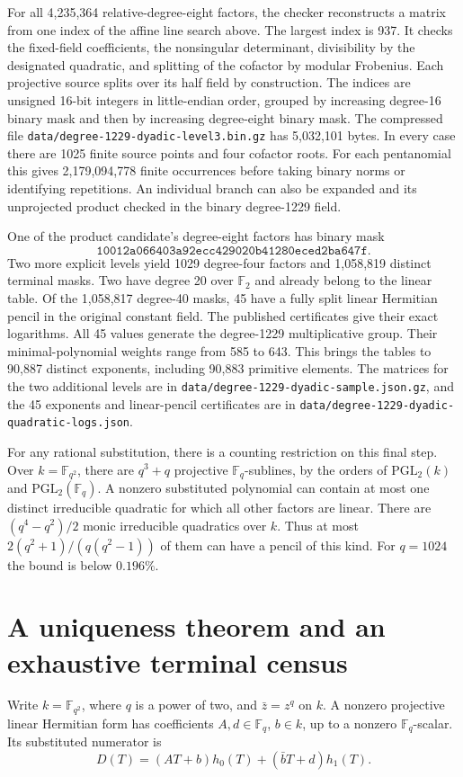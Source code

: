 \documentclass[11pt]{article}
\newcommand{\F}{\mathbb F_2}
\begin{document}
For all 4,235,364 relative-degree-eight factors, the checker
reconstructs a matrix from one index of the affine line search
above. The largest index is 937. It checks the fixed-field
coefficients, the nonsingular determinant, divisibility by the
designated quadratic, and splitting of the cofactor by modular
Frobenius. Each projective source splits over its half field by
construction. The indices are unsigned 16-bit integers in
little-endian order, grouped by increasing degree-16 binary mask and
then by increasing degree-eight binary mask. The compressed file
\nolinkurl{data/degree-1229-dyadic-level3.bin.gz} has 5,032,101 bytes.
In every case there are 1025 finite source points and four cofactor
roots. For each pentanomial this gives 2,179,094,778 finite
occurrences before taking binary norms or identifying repetitions.
An individual branch can also be expanded and its unprojected
product checked in the binary degree-1229 field.

One of the product candidate's degree-eight factors has binary mask
\[
   \mathtt{10012a066403a92ecc429020b41280eced2ba647f}.
\]
Two more explicit levels yield 1029 degree-four factors and 1,058,819
distinct terminal masks. Two have degree 20 over \(\F\) and already
belong to the linear table. Of the 1,058,817 degree-40 masks, 45
have a fully split linear Hermitian pencil in the original constant
field. The published certificates give their exact logarithms.
All 45 values generate the degree-1229 multiplicative group.
Their minimal-polynomial weights range from 585 to 643.
This brings the tables to 90,887 distinct exponents, including
90,883 primitive elements. The matrices for the two additional levels
are in \nolinkurl{data/degree-1229-dyadic-sample.json.gz}, and the
45 exponents and linear-pencil certificates are in
\nolinkurl{data/degree-1229-dyadic-quadratic-logs.json}.

For any rational substitution, there is a counting restriction on
this final step. Over \(k=\mathbb F_{q^2}\), there are
\(q^3+q\) projective \(\mathbb F_q\)-sublines, by the orders of
\(\mathrm{PGL}_2(k)\) and \(\mathrm{PGL}_2(\mathbb F_q)\).
A nonzero substituted polynomial can contain at most one distinct
irreducible quadratic for which all other factors are linear.
There are \((q^4-q^2)/2\) monic irreducible quadratics over \(k\).
Thus at most \(2(q^2+1)/(q(q^2-1))\) of them can have a pencil
of this kind. For \(q=1024\) the bound is below \(0.196\%\).

\section{A uniqueness theorem and an exhaustive terminal census}
\label{sec:terminal-census}
Write \(k=\mathbb F_{q^2}\), where \(q\) is a power of two, and
\(\bar z=z^q\) on \(k\). A nonzero projective linear Hermitian form
has coefficients \(A,d\in\mathbb F_q\), \(b\in k\), up to a nonzero
\(\mathbb F_q\)-scalar. Its substituted numerator is
\[
   D(T)=(AT+b)h_0(T)+(\bar b T+d)h_1(T).
\]
\end{document}
